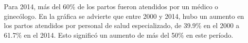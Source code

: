 Para 2014, más del 60\% de los partos fueron atendidos por un médico o ginecólogo. En la gráfica se advierte que entre 2000 y 2014, hubo un aumento en los partos atendidos por personal de salud especializado, de 39.9\% en el 2000 a 61.7\% en el 2014. Esto significó un aumento de más del 50\% en este período.